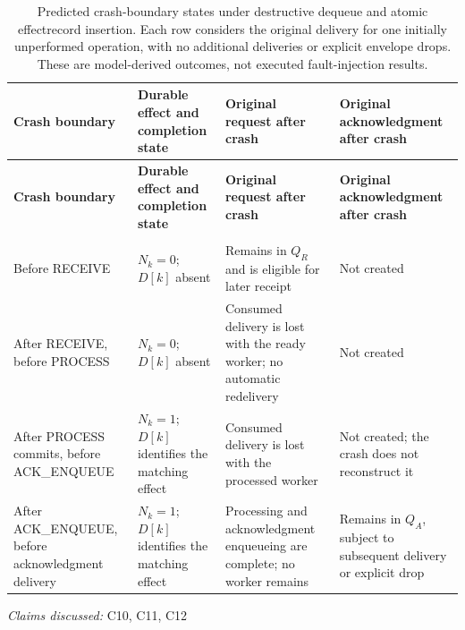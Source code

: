 \documentclass[11pt]{article}
\begin{document}
\begin{landscape}
\small
\begin{longtable}{@{}>{\raggedright\arraybackslash}p{}>{\raggedright\arraybackslash}p{}>{\raggedright\arraybackslash}p{}>{\raggedright\arraybackslash}p{}@{}}
\caption{Predicted crash-boundary states under destructive dequeue and atomic effect\textendash{}record insertion. Each row considers the original delivery for one initially unperformed operation, with no additional deliveries or explicit envelope drops. These are model-derived outcomes, not executed fault-injection results.}\\
\toprule
\textbf{Crash boundary} & \textbf{Durable effect and completion state} & \textbf{Original request after crash} & \textbf{Original acknowledgment after crash}\\
\midrule
\endfirsthead
\toprule
\textbf{Crash boundary} & \textbf{Durable effect and completion state} & \textbf{Original request after crash} & \textbf{Original acknowledgment after crash}\\
\midrule
\endhead
\midrule
\multicolumn{4}{r}{\footnotesize Continued on next page}\\
\endfoot
\bottomrule
\endlastfoot
Before RECEIVE & $N_k=0$; $D[k]$ absent & Remains in $Q_R$ and is eligible for later receipt & Not created\\
After RECEIVE, before PROCESS & $N_k=0$; $D[k]$ absent & Consumed delivery is lost with the ready worker; no automatic redelivery & Not created\\
After PROCESS commits, before ACK\_\allowbreak{}ENQUEUE & $N_k=1$; $D[k]$ identifies the matching effect & Consumed delivery is lost with the processed worker & Not created; the crash does not reconstruct it\\
After ACK\_\allowbreak{}ENQUEUE, before acknowledgment delivery & $N_k=1$; $D[k]$ identifies the matching effect & Processing and acknowledgment enqueueing are complete; no worker remains & Remains in $Q_A$, subject to subsequent delivery or explicit drop\\
\end{longtable}
\par{}
\end{landscape}
\textit{Claims discussed: }C10, C11, C12
\end{document}
